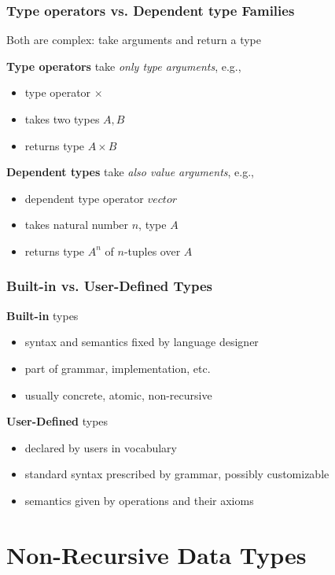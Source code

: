 \begin{frame}\frametitle{Type operators vs. Dependent type Families}
Both are complex: take arguments and return a type

\textbf{Type operators} take \emph{only type arguments}, e.g.,
 \begin{itemize}
 \item type operator $\times$
 \item takes two types $A,B$
 \item returns type $A\times B$
 \end{itemize}

\textbf{Dependent types} take \emph{also value arguments}, e.g.,
 \begin{itemize}
 \item dependent type operator $vector$
 \item takes natural number $n$, type $A$
 \item returns type $A^n$ of $n$-tuples over $A$
 \end{itemize}
\end{frame}


\begin{frame}\frametitle{Built-in vs. User-Defined Types}
\textbf{Built-in} types
\begin{itemize}
\item syntax and semantics fixed by language designer
\item part of grammar, implementation, etc.
\item usually concrete, atomic, non-recursive
\end{itemize}

\textbf{User-Defined} types
\begin{itemize}
\item declared by users in vocabulary
\item standard syntax prescribed by grammar, possibly customizable
\item semantics given by operations and their axioms
\end{itemize}
\end{frame}

\section{Non-Recursive Data Types}


